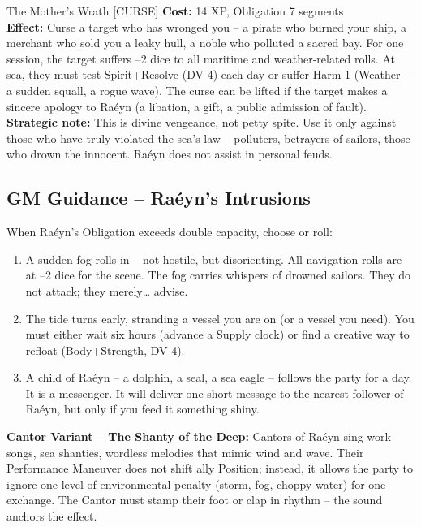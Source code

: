 \documentclass[10pt,a5paper]{book}
\begin{document}
\begin{patronbox}{The Mother’s Wrath [CURSE]}
\textbf{Cost:} 14 XP, Obligation 7 segments \\
\textbf{Effect:} Curse a target who has wronged you – a pirate who burned your ship, a merchant who sold you a leaky hull, a noble who polluted a sacred bay. For one session, the target suffers –2 dice to all maritime and weather‑related rolls. At sea, they must test Spirit+Resolve (DV 4) each day or suffer Harm 1 (Weather – a sudden squall, a rogue wave). The curse can be lifted if the target makes a sincere apology to Raéyn (a libation, a gift, a public admission of fault). \\
\textbf{Strategic note:} This is divine vengeance, not petty spite. Use it only against those who have truly violated the sea’s law – polluters, betrayers of sailors, those who drown the innocent. Raéyn does not assist in personal feuds.
\end{patronbox}

\subsection*{GM Guidance – Raéyn’s Intrusions}

When Raéyn’s Obligation exceeds double capacity, choose or roll:
\begin{enumerate}
    \item A sudden fog rolls in – not hostile, but disorienting. All navigation rolls are at –2 dice for the scene. The fog carries whispers of drowned sailors. They do not attack; they merely… advise.
    \item The tide turns early, stranding a vessel you are on (or a vessel you need). You must either wait six hours (advance a Supply clock) or find a creative way to refloat (Body+Strength, DV 4).
    \item A child of Raéyn – a dolphin, a seal, a sea eagle – follows the party for a day. It is a messenger. It will deliver one short message to the nearest follower of Raéyn, but only if you feed it something shiny.
\end{enumerate}

\noindent \textbf{Cantor Variant – The Shanty of the Deep:}
Cantors of Raéyn sing work songs, sea shanties, wordless melodies that mimic wind and wave. Their Performance Maneuver does not shift ally Position; instead, it allows the party to ignore one level of environmental penalty (storm, fog, choppy water) for one exchange. The Cantor must stamp their foot or clap in rhythm – the sound anchors the effect.
\end{document}
